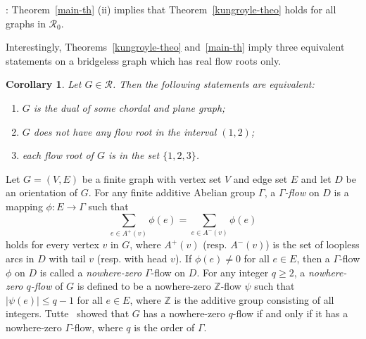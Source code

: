\documentclass[11pt]{article}
\newtheorem{cor}{Corollary}
\newcommand {\red} {\textcolor{red}}
\def \setgr {\mathscr{R}}
\newcommand {\relabel}[1] {\label{#1} \red{[*: #1]}}\newcommand {\rebibitem}[1] {\bibitem{#1} \red{[*: #1]}}%
\def\relabel {\label} \def\rebibitem {\bibitem}  %
\begin{document}
: Theorem~\ref{main-th} (ii)
implies that Theorem~\ref{kungroyle-theo} holds 
for all graphs in $\setgr_0$.


Interestingly, 
Theorems~\ref{kungroyle-theo} and~\ref{main-th}
imply three equivalent statements on 
a bridgeless graph which has real flow roots only.


\begin{cor}\relabel{sect1-cor}
Let $G\in \setgr$. 
Then the following statements are equivalent:
\begin{enumerate}
\item $G$ is the dual of some chordal and plane graph;
\item  $G$ does not have any flow root in the interval $(1,2)$;
\item each flow root of $G$ is in the set $\{1,2,3\}$.
\end{enumerate}
\end{cor}


 

\relabel{sec2}




Let $G=(V,E)$ be a finite graph with vertex set 
$V$ and edge set $E$ and let $D$ be an orientation of $G$. 
For any finite additive Abelian group $\Gamma$, 
a {\it $\Gamma$-flow} on $D$ is a mapping 
$\phi: E\rightarrow \Gamma$ such that 
\begin{equation}\relabel{sec1-eq1}
\sum_{e\in A^+(v)}\phi(e)=\sum_{e\in A^-(v)}\phi(e)
\end{equation}
holds for every vertex $v$ in $G$,
where 
$A^+(v)$ (resp. $A^-(v)$) is the set of loopless arcs in $D$ 
with tail $v$
(resp. with head $v$).
If $\phi(e)\ne 0$ for all $e\in E$, then 
a $\Gamma$-flow $\phi$ on $D$ is called a {\it nowhere-zero}
$\Gamma$-flow on $D$.
For any integer $q\ge 2$, 
a {\it nowhere-zero $q$-flow} of $G$ is defined to be 
a nowhere-zero ${\mathbb Z}$-flow $\psi$
such that $|\psi(e)|\le q-1$ for all $e\in E$,
where ${\mathbb Z}$ is the additive group consisting of 
all integers. 
Tutte~\cite{tut2} showed 
that $G$ has a nowhere-zero $q$-flow
if and only if it has a nowhere-zero $\Gamma$-flow,
where $q$ is the order of $\Gamma$.
\end{document}
